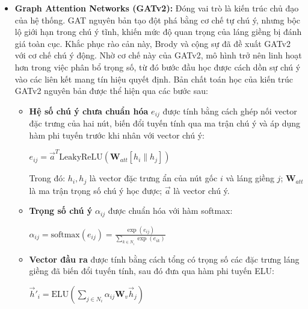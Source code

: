\begin{itemize}[label={--}, itemsep=5pt]
    \item \textbf{Graph Attention Networks (GATv2):} Đóng vai trò là kiến trúc chủ đạo của hệ thống. GAT nguyên bản \cite{velickovic2017graph} tạo đột phá bằng cơ chế tự chú ý, nhưng bộc lộ giới hạn trong chú ý tĩnh, khiến mức độ quan trọng của láng giềng bị đánh giá toàn cục. Khắc phục rào cản này, Brody và cộng sự \cite{brody2021attentive} đã đề xuất GATv2 với cơ chế chú ý động. Nhờ cơ chế này của GATv2, mô hình trở nên linh hoạt hơn trong việc phân bổ trọng số, từ đó bước đầu học được cách dồn sự chú ý vào các liên kết mang tín hiệu quyết định. Bản chất toán học của kiến trúc GATv2 nguyên bản được thể hiện qua các bước sau:
    \begin{itemize}[label={+}, itemsep=2pt]
        \item \textbf{Hệ số chú ý chưa chuẩn hóa} $e_{ij}$ được tính bằng cách ghép nối vector đặc trưng của hai nút, biến đổi tuyến tính qua ma trận chú ý và áp dụng hàm phi tuyến trước khi nhân với vector chú ý:

        \begin{center}
        \(
            e_{ij} = \vec{a}^T \text{LeakyReLU}\left( \mathbf{W}_{att} [h_i \| h_j] \right)
        \)
        \end{center}

        Trong đó: $h_i, h_j$ là vector đặc trưng ẩn của nút gốc $i$ và láng giềng $j$; $\mathbf{W}_{att}$ là ma trận trọng số chú ý học được; $\vec{a}$ là vector chú ý.

        \item \textbf{Trọng số chú ý} $\alpha_{ij}$ được chuẩn hóa với hàm softmax:

        \begin{center}
        \(
            \alpha_{ij} = \text{softmax}(e_{ij}) = \frac{\exp(e_{ij})}{\sum_{k \in N_i} \exp(e_{ik})}
        \)
        \end{center}

        \item \textbf{Vector đầu ra} được tính bằng cách tổng có trọng số các đặc trưng láng giềng đã biến đổi tuyến tính, sau đó đưa qua hàm phi tuyến ELU:

        \begin{center}
        \(
            \vec{h}'_i = \text{ELU} \left( \sum_{j \in N_i} \alpha_{ij} \mathbf{W}_v\vec{h}_j \right)
        \)
        \end{center}


\end{itemize}
\end{itemize}
